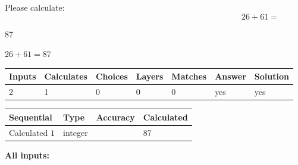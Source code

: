 \documentclass[12pt]{article}
\begin{document}
Please calculate:
\begin{equation}
26 +  %
61 = \nonumber
\end{equation}
 
 
 
\noindent{}
 
 

87
 
 
\noindent{}
 
 

 
 
 
\noindent{}
 
 

$ %
26 +  %
61=   %
87$
 
 
\noindent{}
 
 

 
   
   
   
   
\noindent\begin{tabular}{|l|l|l|l|l|l|l|}
 \hline
Inputs & Calculates & Choices & Layers & Matches & Answer & Solution \\ \hline
 2  & 
 1  & 
 0
  & 
 0  & 
 0  & 
  yes & 
  yes 
  \\ \hline
 \end{tabular}
   
   
   
   
\noindent{}
   
   
  
  
\noindent\begin{tabular}{|l|l|l|l|}
\hline
 Sequential & Type & Accuracy & Calculated \\ 
\hline
 
 
  Calculated $  1 $ & integer &  & 
  $ 87 $ 
 \\  \hline  
 \end{tabular}
   
   
   
   
\noindent\vspace{0.1in}\hspace{-0.08in} {\textbf{\Large{All inputs: }}}
   
   
  
\end{document}
